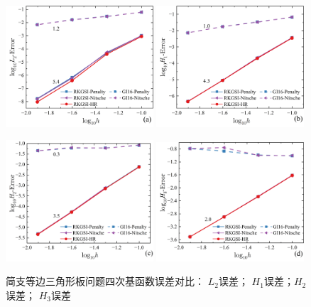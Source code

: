 \newpage
\begin{figure}[H]
    \centering
    \begin{subcaptiongroup}
    \includegraphics[width=0.49\textwidth]{figure/PHR/T/QL2.png}
    \label{QL2}
    \includegraphics[width=0.49\textwidth]{figure/PHR/T/QH1.png}
    \label{QH1}
    \end{subcaptiongroup}
    \begin{subcaptiongroup}
    \includegraphics[width=0.49\textwidth]{figure/PHR/T/QH2.png}
    \label{QH2}
    \includegraphics[width=0.49\textwidth]{figure/PHR/T/QH3.png}
    \label{QH3}
    \end{subcaptiongroup}
\caption{简支等边三角形板问题四次基函数误差对比： $L_2$误差； $H_1$误差；$H_2$误差； $H_3$误差}
\label{TQLH}
\end{figure}
